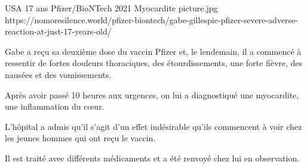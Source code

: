 {USA}
{17 ans}
{Pfizer/BioNTech}
{2021}
{Myocardite}
{picture.jpg}
{https://nomoresilence.world/pfizer-biontech/gabe-gillespie-pfizer-severe-adverse-reaction-at-just-17-years-old/}
{
  
Gabe a reçu sa deuxième dose du vaccin Pfizer et, le lendemain, il a commencé à
ressentir de fortes douleurs thoraciques, des étourdissements, une forte fièvre,
des nausées et des vomissements.

Après avoir passé 10 heures aux urgences, on lui a diagnostiqué une myocardite,
une inflammation du cœur.

L'hôpital a admis qu'il s'agit d'un effet indésirable qu'ils commencent à voir
chez les jeunes hommes qui ont reçu le vaccin.

Il est traité avec différents médicaments et a été renvoyé chez lui en
observation.

}
